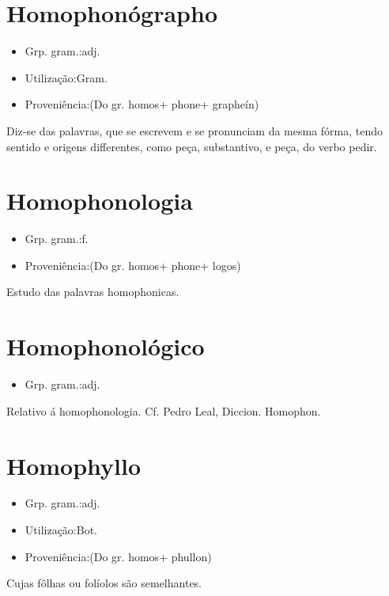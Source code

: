 \documentclass{article}
\begin{document}
\section{Homophonógrapho}
\begin{itemize}
\item {Grp. gram.:adj.}
\end{itemize}
\begin{itemize}
\item {Utilização:Gram.}
\end{itemize}
\begin{itemize}
\item {Proveniência:(Do gr. \textunderscore homos\textunderscore  + \textunderscore phone\textunderscore  + \textunderscore grapheín\textunderscore )}
\end{itemize}
Diz-se das palavras, que se escrevem e se pronunciam da mesma fórma, tendo sentido e origens differentes, como \textunderscore peça\textunderscore , substantivo, e \textunderscore peça\textunderscore , do verbo \textunderscore pedir\textunderscore .
\section{Homophonologia}
\begin{itemize}
\item {Grp. gram.:f.}
\end{itemize}
\begin{itemize}
\item {Proveniência:(Do gr. \textunderscore homos\textunderscore  + \textunderscore phone\textunderscore  + \textunderscore logos\textunderscore )}
\end{itemize}
Estudo das palavras homophonicas.
\section{Homophonológico}
\begin{itemize}
\item {Grp. gram.:adj.}
\end{itemize}
Relativo á homophonologia. Cf. Pedro Leal, \textunderscore Diccion. Homophon.\textunderscore 
\section{Homophyllo}
\begin{itemize}
\item {Grp. gram.:adj.}
\end{itemize}
\begin{itemize}
\item {Utilização:Bot.}
\end{itemize}
\begin{itemize}
\item {Proveniência:(Do gr. \textunderscore homos\textunderscore  + \textunderscore phullon\textunderscore )}
\end{itemize}
Cujas fôlhas ou folíolos são semelhantes.
\end{document}
